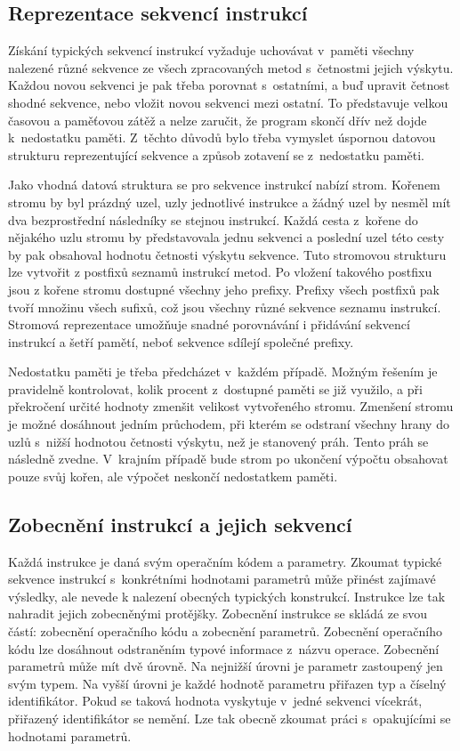\subsection{Reprezentace sekvencí instrukcí}

Získání typických sekvencí instrukcí vyžaduje uchovávat v~paměti všechny nalezené různé sekvence ze všech zpracovaných metod s~četnostmi jejich výskytu. Každou novou sekvenci je pak třeba porovnat s~ostatními, a buď upravit četnost shodné sekvence, nebo vložit novou sekvenci mezi ostatní. To představuje velkou časovou a paměťovou zátěž a nelze zaručit, že program skončí dřív než dojde k~nedostatku paměti. Z~těchto důvodů bylo třeba vymyslet úspornou datovou strukturu reprezentující sekvence a způsob zotavení se z~nedostatku paměti.

Jako vhodná datová struktura se pro sekvence instrukcí nabízí strom. Kořenem stromu by byl prázdný uzel, uzly jednotlivé instrukce a žádný uzel by nesměl mít dva bezprostřední následníky se stejnou instrukcí. Každá cesta z~kořene do nějakého uzlu stromu by představovala jednu sekvenci a poslední uzel této cesty by pak obsahoval hodnotu četnosti výskytu sekvence. Tuto stromovou strukturu lze vytvořit z postfixů seznamů instrukcí metod. 
Po vložení takového postfixu jsou z kořene stromu dostupné všechny jeho prefixy. Prefixy všech postfixů pak tvoří množinu všech sufixů, což jsou všechny různé sekvence seznamu instrukcí.
Stromová reprezentace umožňuje snadné porovnávání i přidávání sekvencí instrukcí a šetří pamětí, neboť sekvence sdílejí společné prefixy.

Nedostatku paměti je třeba předcházet v~každém případě. Možným řešením je pravidelně kontrolovat, kolik procent z~dostupné paměti se již využilo, a při překročení určité hodnoty zmenšit velikost vytvořeného stromu. Zmenšení stromu je možné dosáhnout jedním průchodem, při kterém se odstraní všechny hrany do uzlů s~nižší hodnotou četnosti výskytu, než je stanovený práh. Tento práh se následně zvedne. V~krajním případě bude strom po ukončení výpočtu obsahovat pouze svůj kořen, ale výpočet neskončí nedostatkem paměti.

\subsection{Zobecnění instrukcí a jejich sekvencí}

Každá instrukce je daná svým operačním kódem a parametry. Zkoumat typické sekvence instrukcí s~konkrétními hodnotami parametrů může přinést zajímavé výsledky, ale nevede k nalezení obecných typických konstrukcí. Instrukce lze tak nahradit jejich zobecněnými protějšky. Zobecnění instrukce se skládá ze svou částí: zobecnění operačního kódu a zobecnění parametrů. Zobecnění operačního kódu lze dosáhnout odstraněním typové informace z~názvu operace. Zobecnění parametrů může mít dvě úrovně. Na nejnižší úrovni je parametr zastoupený jen svým typem. Na vyšší úrovni je každé hodnotě parametru přiřazen typ a číselný identifikátor. Pokud se taková hodnota vyskytuje v~jedné sekvenci vícekrát, přiřazený identifikátor se nemění. Lze tak obecně zkoumat práci s~opakujícími se hodnotami parametrů.

